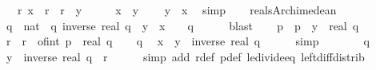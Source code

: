\begin{isabellebody}
\ \ \ {\isachardoublequoteopen}{\isasymexists}r{\isasymin}{\isasymrat}{\isachardot}{\kern0pt}\ x\ {\isacharless}{\kern0pt}\ r\ {\isasymand}\ r\ {\isacharless}{\kern0pt}\ y{\isachardoublequoteclose}\isanewline
%
\isadelimproof
%
\endisadelimproof
%
\isatagproof
{}\isamarkupfalse%
\ {\isacharminus}{\kern0pt}\isanewline
\ \ \isamarkupfalse%
\ {\isacartoucheopen}x\ {\isacharless}{\kern0pt}\ y{\isacartoucheclose}\ \isamarkupfalse%
\ {\isachardoublequoteopen}{}\ {\isacharless}{\kern0pt}\ y\ {\isacharminus}{\kern0pt}\ x{\isachardoublequoteclose}\ \isamarkupfalse%
\ simp\isanewline
\ \ \isamarkupfalse%
\ reals{\isacharunderscore}{\kern0pt}Archimedean\ \isamarkupfalse%
\ q\ {\isacharcolon}{\kern0pt}{\isacharcolon}{\kern0pt}\ nat\ \ q{\isacharcolon}{\kern0pt}\ {\isachardoublequoteopen}inverse\ {\isacharparenleft}{\kern0pt}real\ q{\isacharparenright}{\kern0pt}\ {\isacharless}{\kern0pt}\ y\ {\isacharminus}{\kern0pt}\ x{\isachardoublequoteclose}\ \ {\isachardoublequoteopen}{}\ {\isacharless}{\kern0pt}\ q{\isachardoublequoteclose}\isanewline
\ \ \ \ \isamarkupfalse%
\ blast\isanewline
\ \ \isamarkupfalse%
\ p\ \ {\isachardoublequoteopen}p\ {\isacharequal}{\kern0pt}\ {\isasymlceil}y\ {\isacharasterisk}{\kern0pt}\ real\ q{\isasymrceil}\ {\isacharminus}{\kern0pt}\ {}{\isachardoublequoteclose}\isanewline
\ \ \isamarkupfalse%
\ r\ \ {\isachardoublequoteopen}r\ {\isacharequal}{\kern0pt}\ of{\isacharunderscore}{\kern0pt}int\ p\ {\isacharslash}{\kern0pt}\ real\ q{\isachardoublequoteclose}\isanewline
\ \ \isamarkupfalse%
\ q\ \isamarkupfalse%
\ {\isachardoublequoteopen}x\ {\isacharless}{\kern0pt}\ y\ {\isacharminus}{\kern0pt}\ inverse\ {\isacharparenleft}{\kern0pt}real\ q{\isacharparenright}{\kern0pt}{\isachardoublequoteclose}\isanewline
\ \ \ \ \isamarkupfalse%
\ simp\isanewline
\ \ \isamarkupfalse%
\ \isamarkupfalse%
\ {\isacartoucheopen}{}\ {\isacharless}{\kern0pt}\ q{\isacartoucheclose}\ \isamarkupfalse%
\ {\isachardoublequoteopen}y\ {\isacharminus}{\kern0pt}\ inverse\ {\isacharparenleft}{\kern0pt}real\ q{\isacharparenright}{\kern0pt}\ {\isasymle}\ r{\isachardoublequoteclose}\isanewline
\ \ \ \ \isamarkupfalse%
\ {\isacharparenleft}{\kern0pt}simp\ add{\isacharcolon}{\kern0pt}\ r{\isacharunderscore}{\kern0pt}def\ p{\isacharunderscore}{\kern0pt}def\ le{\isacharunderscore}{\kern0pt}divide{\isacharunderscore}{\kern0pt}eq\ left{\isacharunderscore}{\kern0pt}diff{\isacharunderscore}{\kern0pt}distrib{\isacharparenright}{\kern0pt}\isanewline

\end{isabellebody}
